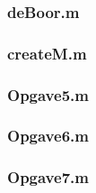 \documentclass[a4paper]{article}
\begin{document}
\subsubsection{deBoor.m}\label{sec:codedb}


\subsubsection{createM.m}\label{sec:codeM}


\subsubsection{Opgave5.m}\label{sec:code5}


\subsubsection{Opgave6.m}\label{sec:code6}


\subsubsection{Opgave7.m}\label{sec:code7}

\end{document}
